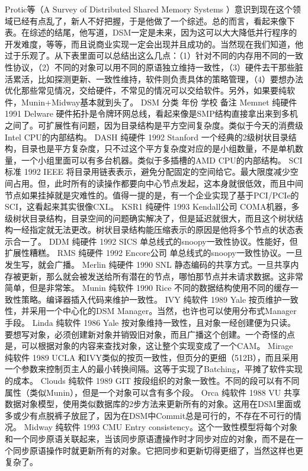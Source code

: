 \documentclass[a4paper,twoside]{scrbook}
\begin{document}
Protic等（A Survey of Distributed Shared Memory Systems ）意识到现在这个领域已经有点乱了，新人不好把握，于是他做了一个综述。总的而言，看起来像下表。在综述的结尾，他写道，DSM一定是未来，因为这可以大大降低并行程序的开发难度，等等，而且说商业实现一定会出现并且成功的。当然现在我们知道，他过于乐观了。从下表里面可以总结出这么几点：（1）针对不同的内存用不同的一致性协议，（2）不同的对象可以用不同的原语独立维持一致性，（3）硬件去干那些脏活累活，比如探测更新、一致性维持，软件则负责具体的策略管理，（4）要想办法优化那些常见情况，交给硬件，不常见的情况可以交给软件。另外，如果要纯软件，Munin+Midway基本就到头了。
DSM	分类	年份	学校	备注
Memnet	纯硬件	1991	Delware	硬件拓扑是令牌环网总线，看起来像是SMP结构直接拿出来到多机之间了。可扩展性有问题，因为目录结构是平方空间复杂度。类似于今天的消费级Intel CPU的内部结构。
DASH	纯硬件	1992	Stanford	一个经典的2级树状目录结构，目录也是平方复杂度，只不过这个平方复杂度对应的是小组数量，不是单机数量，一个小组里面可以有多台机器。类似于多插槽的AMD CPU的内部结构。
SCI	标准	1992	IEEE	将目录用链表表示，避免分配固定的空间给它。最大限度减少空间占用。但，此时所有的读操作都要向中心节点发起，这本身就很低效，而且中间节点如果挂掉就是灾难性的。值得一提的是，有一个企业实现了基于PCI/PCIe的SCI，这看起来其实很像CXL。
KSR1	纯硬件	1993	Kendall公司	COMA机器，多级树状目录结构，目录空间的问题确实解决了，但是延迟就很大，而且这个树状结构一经指定就无法更改。树状目录结构能压缩表示的原因是他将多个节点的状态表示合一了。
DDM	纯硬件	1992	SICS	单总线式的snoopy一致性协议。性能好，但扩展性糟糕。
RMS	纯硬件	1992	Encore公司	单总线式的snoopy一致性协议。一旦发生写，就会广播。
Merlin	纯硬件	1990	SNL	静态编码的共享方式。一旦共享内存被更新，那么就会被发送给所有潜在的节点，哪怕那节点并未请求数据。这非常简单，但是非常笨。
Munin	纯软件	1990	Rice	不同的数据结构使用不同的缓存一致性策略。编译器插入代码来维护一致性。
IVY	纯软件	1989	Yale	按页维护一致性，并采用一个中心化的DSM Manager。当然，也许也可以使用分布式Manager手段。
Linda	纯软件	1986	Yale	按对象维持一致性，且对象一经创建便为只读。要想写对象，必须创建新对象并销毁旧对象，而且广播这个创建。一个奇怪的点是，可以根据对象的内容来查找对象，这让整个实现变成了一个CAM。
Mirage	纯软件	1989	UCLA	和IVY类似的按页一致性，但页分的更细（512B），而且采用一个参数来控制页主人的最小转换间隔。这等于实现了Batching，平摊了软件实现的成本。
Clouds	纯软件	1989	GIT	按段组织的对象一致性。不同的段可以有不同属性（类似Munin），但是一个对象可以含有多个段。
Orca	纯软件	1988	VU	共享数据对象模型，使用类似数据库的2步方法来更新所有的对象。这用在DSM里面或多或少有点脱裤子放屁了，因为在DSM中Commit总是可行的，不存在不可行的情况。
Midway	纯软件	1993	CMU	Entry consistency。这个一致性模型将每个对象和一个同步原语关联起来，当该同步原语遭操作时才同步对应的对象，而不是在一个同步原语操作时就更新所有的对象。它把同步和更新切得更细了，当然这样也更复杂了。
\end{document}
